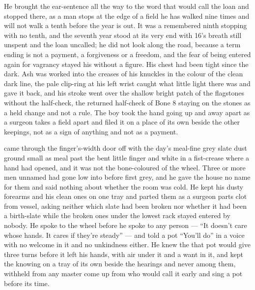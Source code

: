 He brought the ear-sentence all the way to the word that would call the loan and stopped there, as a man stops at the edge of a field he has walked nine times and will not walk a tenth before the year is out. It was a remembered ninth stopping with no tenth, and the seventh year stood at its very end with  16's breath still unspent and the loan uncalled; he did not look along the road, because a term ending is not a payment, a forgiveness or a freedom, and the fear of being entered again for vagrancy stayed his without a figure. His chest had been tight since the dark. Ash was worked into the creases of his knuckles in the colour of the clean dark line, the pale clip-ring at his left wrist caught what little light there was and gave it back, and his stroke went over the shallow bright patch of the flagstones without the half-check, the returned half-check of Bone 8 staying on the stones as a held change and not a rule. The boy took the hand going up and away apart as a surgeon takes a field apart and filed it on a place of its own beside the other keepings, not as a sign of anything and not as a payment.

\scenebreak

 came through the finger's-width door off  with the day's meal-fine grey slate dust ground small as meal past the bent little finger and white in a fist-crease where a hand had opened, and it was not the bone-coloured  of the wheel. Three or more men unnamed had gone low into  before first grey, and he gave the house no name for them and said nothing about whether the room was cold. He kept his dusty forearms and his clean ones on one tray and parted them as a surgeon parts clot from vessel, asking neither which slate had been broken nor whether it had been a birth-slate while the broken ones under the lowest rack stayed entered by nobody. He spoke to the wheel before he spoke to any person --- “It doesn't care whose hands. It cares if they're steady” --- and told a pot “You'll do” in a voice with no welcome in it and no unkindness either. He knew the  that pot would give three turns before it left his hands, with air under it and a want in it, and kept the knowing on a tray of its own beside the hearings and never among them, withheld from any master come up from  who would call it early and sing a pot before its time.

